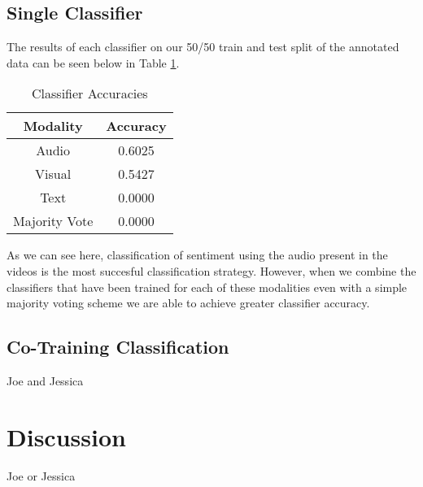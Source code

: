 \documentclass[twoside]{article}
\begin{document}
\begin{multicols}{2}
\subsection{Single Classifier}
The results of each classifier on our 50/50 train and test split of the annotated data can be seen below in Table \ref{tab:SingleResults}.

\begin{table}[H]
\centering
\caption{Classifier Accuracies}
\label{tab:SingleResults}
\begin{tabular}{| c | c |} 
\hline
 Modality & Accuracy \\ \hline \hline
Audio & 0.6025 \\ \hline
Visual & 0.5427 \\ \hline
Text & {\color{red}0.0000} \\ \hline
Majority Vote & {\color{red}0.0000} \\ \hline
\end{tabular}
\end{table}

As we can see here, classification of sentiment using the audio present in the videos is the most succesful classification strategy.
However, when we combine the classifiers that have been trained for each of these modalities even with a simple majority voting scheme we are able to achieve greater classifier accuracy.

\subsection{Co-Training Classification}
Joe and Jessica


\section{Discussion}
Joe or Jessica





\end{multicols}
\end{document}
